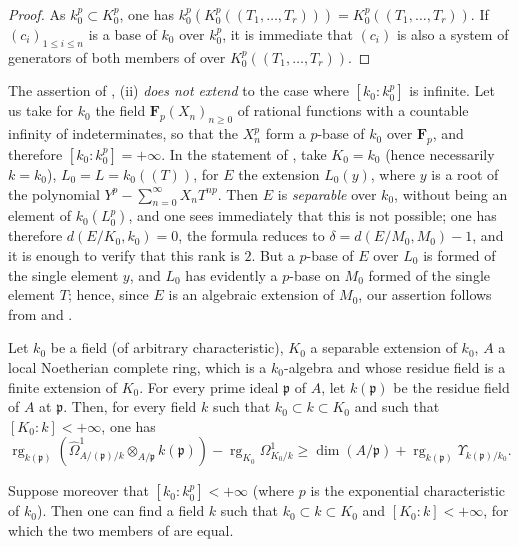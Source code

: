 \begin{proof}
As $k_0^p\subset K_0^p$, one has $k^p_0(K_0^p((T_1,\ldots,T_r)))=K_0^p((T_1,\ldots,T_r))$.
If $(c_i)_{1\leqslant i\leqslant n}$ is a base of $k_0$ over $k_0^p$, it is immediate that $(c_i)$ is also a system of generators of both members of  over $K_0^p((T_1,\ldots,T_r))$.
\end{proof}

\begin{remark}[21.9.7]
\label{0.21.9.7}
The assertion of , (ii) \emph{does not extend} to the case where $[k_0:k_0^p]$ is infinite.
Let us take for $k_0$ the field $\mathbf{F}_p(X_n)_{n\geqslant 0}$ of rational functions with a countable infinity of indeterminates, so that the $X_n^p$ form a $p$-base of $k_0$ over $\mathbf{F}_p$, and therefore $[k_0:k_0^p]=+\infty$.
In the statement of , take $K_0=k_0$ (hence necessarily $k=k_0$), $L_0=L=k_0((T))$, for $E$ the extension $L_0(y)$, where $y$ is a root of the polynomial $Y^p-\sum_{n=0}^\infty X_n T^{np}$.
Then $E$ is \emph{separable} over $k_0$, without being an element of $k_0(L_0^p)$, and one sees immediately that this is not possible; one has therefore $d(E/K_0,k_0)=0$, the formula  reduces to $\delta=d(E/M_0,M_0)-1$, and it is enough to verify that this rank is $2$.
But a $p$-base of $E$ over $L_0$ is formed of the single element $y$, and $L_0$ has evidently a $p$-base on $M_0$ formed of the single element $T$; hence, since $E$ is an algebraic extension of $M_0$, our assertion follows from  and .
\end{remark}

\begin{proposition}[21.9.8]
\label{0.21.9.8}
Let $k_0$ be a field \textup{(}of arbitrary characteristic\textup{)}, $K_0$ a separable extension of $k_0$, $A$ a local Noetherian complete ring, which is a $k_0$-algebra and whose residue field is a finite extension of $K_0$.
For every prime ideal $\mathfrak{p}$ of $A$, let $k(\mathfrak{p})$ be the residue field of $A$ at $\mathfrak{p}$.
Then, for every field $k$ such that $k_0\subset k\subset K_0$ and such that $[K_0:k]<+\infty$, one has
\begin{equation}
\tag{21.9.8.1}
  \label{0.21.9.8.1}
  \operatorname{rg}_{k(\mathfrak{p})}(\widehat{\Omega}^1_{A/(\mathfrak{p})/k}\otimes_{A/\mathfrak{p}} k(\mathfrak{p}))-\operatorname{rg}_{K_0}\Omega^1_{K_0/k}\geqslant\dim(A/\mathfrak{p})+\operatorname{rg}_{k(\mathfrak{p})}\Upsilon_{k(\mathfrak{p})/k_0}.
\end{equation}

Suppose moreover that $[k_0:k_0^p]<+\infty$ \textup{(}where $p$ is the exponential characteristic of $k_0$\textup{)}.
Then one can find a field $k$ such that $k_0\subset k\subset K_0$ and $[K_0:k]<+\infty$, for which the two members of  are equal.
\end{proposition}

